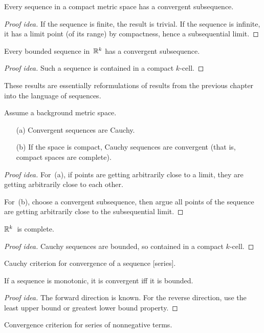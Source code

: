 \begin{thm}
Every sequence in a compact metric space has a convergent subsequence.
\end{thm}
\begin{proof}[Proof idea]
If the sequence is finite, the result is trivial. If the sequence is infinite, it has a limit point (of its range) by compactness, hence a subsequential limit.
\end{proof}
\begin{cor}
Every bounded sequence in~\(\R^k\) has a convergent subsequence.
\end{cor}
\begin{proof}[Proof idea]
Such a sequence is contained in a compact \(k\)-cell.
\end{proof}
\begin{rmk}
These results are essentially reformulations of results from the previous chapter into the language of sequences.
\end{rmk}

\begin{thm}
Assume a background metric space.
\begin{enumerate}[itemsep=0pt]
\item[(a)] Convergent sequences are Cauchy.
\item[(b)] If the space is compact, Cauchy sequences are convergent (that is, compact spaces are complete).
\end{enumerate}
\end{thm}
\begin{proof}[Proof idea]
For~(a), if points are getting arbitrarily close to a limit, they are getting arbitrarily close to each other.

For~(b), choose a convergent subsequence, then argue all points of the sequence are getting arbitrarily close to the subsequential limit.
\end{proof}
\begin{cor}[Completeness of~\(\R^k\)]
\(\R^k\)~is complete.
\end{cor}
\begin{proof}[Proof idea]
Cauchy sequences are bounded, so contained in a compact \(k\)-cell.
\end{proof}
\begin{app}
Cauchy criterion for convergence of a sequence [series].
\end{app}

\begin{thm}
If a sequence is monotonic, it is convergent iff it is bounded.
\end{thm}
\begin{proof}[Proof idea]
The forward direction is known. For the reverse direction, use the least upper bound or greatest lower bound property.
\end{proof}
\begin{app}
Convergence criterion for series of nonnegative terms.
\end{app}

